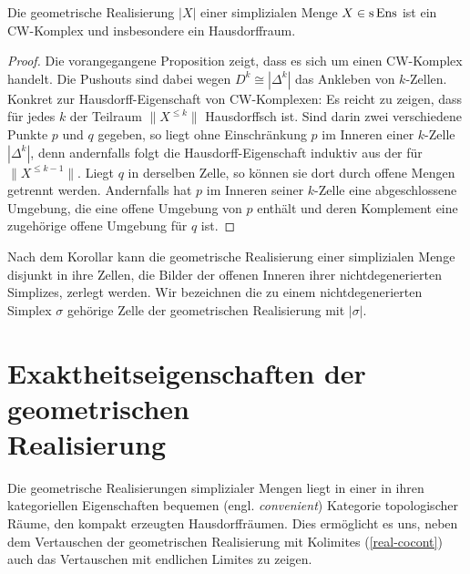 \begin{kor} \label{real-hd}
  Die geometrische Realisierung $|X|$ einer simplizialen Menge $X \in
  \operatorname{s}\operatorname{Ens}$ ist ein CW-Komplex und insbesondere ein Hausdorffraum.
\end{kor}
\begin{proof}
  Die vorangegangene Proposition zeigt, dass es sich um einen
  CW-Komplex handelt. Die Pushouts sind dabei wegen $D^k \cong
  |\Delta^k|$ das Ankleben von $k$-Zellen. Konkret zur
  Hausdorff-Eigenschaft von CW-Komplexen: Es reicht zu zeigen, dass
  für jedes $k$ der Teilraum $\|X^{\leq k}\|$ Hausdorffsch ist. Sind
  darin zwei verschiedene Punkte $p$ und $q$ gegeben, so liegt ohne
  Einschränkung $p$ im Inneren einer $k$-Zelle $|\Delta^k|$, denn
  andernfalls folgt die Hausdorff-Eigenschaft induktiv aus der für
  $\|X^{\leq k-1}\|$. Liegt $q$ in derselben Zelle, so können sie dort
  durch offene Mengen getrennt werden. Andernfalls hat $p$ im Inneren
  seiner $k$-Zelle eine abgeschlossene Umgebung, die eine offene
  Umgebung von $p$ enthält und deren Komplement eine zugehörige offene
  Umgebung für $q$ ist.
\end{proof}
\begin{bem} \label{cw-cells}
  Nach dem Korollar kann die geometrische Realisierung einer
  simplizialen Menge disjunkt in ihre Zellen, die Bilder der offenen
  Inneren ihrer nichtdegenerierten Simplizes, zerlegt werden. Wir
  bezeichnen die zu einem nichtdegenerierten Simplex $\sigma$ gehörige
  Zelle der geometrischen Realisierung mit $|\sigma|$.
\end{bem}

\section[Exaktheitseigenschaften der geometrischen Realisierung]
        {\texorpdfstring{Exaktheitseigenschaften der geometrischen\\
            Realisierung}
          {Exaktheitseigenschaften der geometrischen Realisierung}
        }

Die geometrische Realisierungen simplizialer Mengen liegt in einer in
ihren kategoriellen Eigenschaften bequemen (engl. \emph{convenient})
Kategorie topologischer Räume, den kompakt erzeugten
Hausdorffräumen. Dies ermöglicht es uns, neben dem Vertauschen der
geometrischen Realisierung mit Kolimites (\ref{real-cocont}) auch das
Vertauschen mit endlichen Limites zu zeigen.

